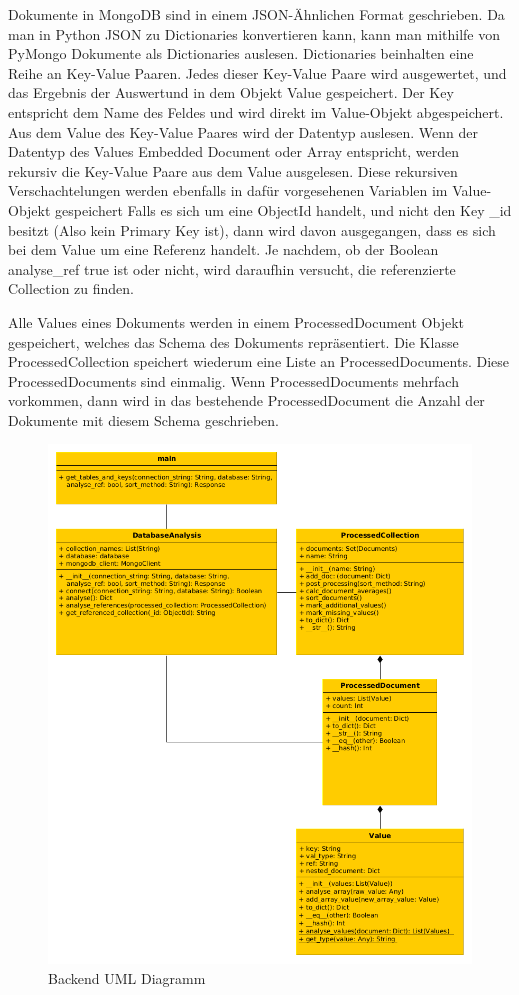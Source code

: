Dokumente in MongoDB sind in einem JSON-Ähnlichen Format geschrieben.
Da man in Python JSON zu Dictionaries konvertieren kann, kann man mithilfe von PyMongo Dokumente als Dictionaries auslesen.
Dictionaries beinhalten eine Reihe an Key-Value Paaren.
Jedes dieser Key-Value Paare wird ausgewertet, und das Ergebnis der Auswertund in dem Objekt Value gespeichert.
Der Key entspricht dem Name des Feldes und wird direkt im Value-Objekt abgespeichert.
Aus dem Value des Key-Value Paares wird der Datentyp auslesen.
Wenn der Datentyp des Values Embedded Document oder Array entspricht, werden rekursiv die Key-Value Paare aus dem Value ausgelesen. 
Diese rekursiven Verschachtelungen werden ebenfalls in dafür vorgesehenen Variablen im Value-Objekt gespeichert
Falls es sich um eine ObjectId handelt, und nicht den Key \_id besitzt (Also kein Primary Key ist), dann wird davon ausgegangen, dass es sich bei dem Value um eine Referenz handelt.
Je nachdem, ob der Boolean analyse\_ref true ist oder nicht, wird daraufhin versucht, die referenzierte Collection zu finden. 

Alle Values eines Dokuments werden in einem ProcessedDocument Objekt gespeichert, welches das Schema des Dokuments repräsentiert.
Die Klasse ProcessedCollection speichert wiederum eine Liste an ProcessedDocuments.
Diese ProcessedDocuments sind einmalig.
Wenn ProcessedDocuments mehrfach vorkommen, dann wird in das bestehende ProcessedDocument die Anzahl der Dokumente mit diesem Schema geschrieben.

\begin{figure}[H]
    \includegraphics[width=\textwidth]{images/backend_uml}
    \caption{Backend UML Diagramm}
    \label{fig:backend_uml}
\end{figure}

